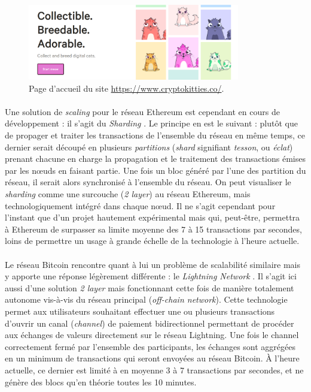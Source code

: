 \begin{figure}[h]
    \centering
    \includegraphics[width=350px]{chapters/02/images/cryptokitties.png}
    \caption{\label{cryptokitties} Page d'accueil du site \url{https://www.cryptokitties.co/}.}
\end{figure}

\paragraph{} Une solution de \emph{scaling} pour le réseau Ethereum est cependant en cours de développement : il s'agit du 
\emph{Sharding} \cite{Blockchain0}. Le principe en est le suivant : plutôt que de propager et traiter les transactions de
l'ensemble du réseau en même temps, ce dernier serait découpé en plusieurs \emph{partitions} (\emph{shard} signifiant 
\emph{tesson}, ou \emph{éclat}) prenant chacune en charge la propagation et le traitement des transactions émises par les
n\oe{}uds en faisant partie. Une fois un bloc généré par l'une des partition du réseau, il serait alors synchronisé à l'ensemble
du réseau. On peut visualiser le \emph{sharding} comme une surcouche (\emph{2 layer}) au réseau Ethereum, mais technologiquement
intégré dans chaque n\oe{}ud. Il ne s'agit cependant pour l'instant que d'un projet hautement expérimental mais qui, peut-être, 
permettra à Ethereum de surpasser sa limite moyenne des 7 à 15 transactions par secondes, loins de permettre un usage à grande
échelle de la technologie à l'heure actuelle.

\paragraph{} Le réseau Bitcoin rencontre quant à lui un problème de scalabilité similaire mais y apporte une réponse légèrement
différente : le \emph{Lightning Network} \cite{Blockchain2}. Il s'agit ici aussi d'une solution \emph{2 layer} mais
fonctionnant cette fois de manière totalement autonome vis-à-vis du réseau principal (\emph{off-chain network}). Cette 
technologie permet aux utilisateurs souhaitant effectuer une ou plusieurs transactions d'ouvrir un canal (\emph{channel})
de paiement bidirectionnel permettant de procéder aux échanges de valeurs directement sur le réseau Lightning. Une fois
le channel correctement fermé par l'ensemble des participants, les échanges sont aggrégées en un minimum de transactions
qui seront envoyées au réseau Bitcoin. À l'heure actuelle, ce dernier est limité à en moyenne 3 à 7 transactions par secondes,
et ne génère des blocs qu'en théorie toutes les 10 minutes.

